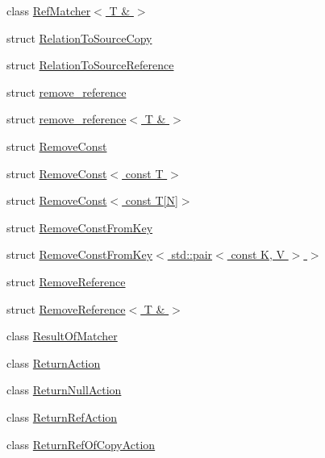 \begin{DoxyCompactItemize}
\item 
class \hyperlink{classtesting_1_1internal_1_1_ref_matcher_3_01_t_01_6_01_4}{Ref\+Matcher$<$ T \& $>$}
\item 
struct \hyperlink{structtesting_1_1internal_1_1_relation_to_source_copy}{Relation\+To\+Source\+Copy}
\item 
struct \hyperlink{structtesting_1_1internal_1_1_relation_to_source_reference}{Relation\+To\+Source\+Reference}
\item 
struct \hyperlink{structtesting_1_1internal_1_1remove__reference}{remove\+\_\+reference}
\item 
struct \hyperlink{structtesting_1_1internal_1_1remove__reference_3_01_t_01_6_01_4}{remove\+\_\+reference$<$ T \& $>$}
\item 
struct \hyperlink{structtesting_1_1internal_1_1_remove_const}{Remove\+Const}
\item 
struct \hyperlink{structtesting_1_1internal_1_1_remove_const_3_01const_01_t_01_4}{Remove\+Const$<$ const T $>$}
\item 
struct \hyperlink{structtesting_1_1internal_1_1_remove_const_3_01const_01_t[_n]_4}{Remove\+Const$<$ const T\mbox{[}\+N\mbox{]}$>$}
\item 
struct \hyperlink{structtesting_1_1internal_1_1_remove_const_from_key}{Remove\+Const\+From\+Key}
\item 
struct \hyperlink{structtesting_1_1internal_1_1_remove_const_from_key_3_01std_1_1pair_3_01const_01_k_00_01_v_01_4_01_4}{Remove\+Const\+From\+Key$<$ std\+::pair$<$ const K, V $>$ $>$}
\item 
struct \hyperlink{structtesting_1_1internal_1_1_remove_reference}{Remove\+Reference}
\item 
struct \hyperlink{structtesting_1_1internal_1_1_remove_reference_3_01_t_01_6_01_4}{Remove\+Reference$<$ T \& $>$}
\item 
class \hyperlink{classtesting_1_1internal_1_1_result_of_matcher}{Result\+Of\+Matcher}
\item 
class \hyperlink{classtesting_1_1internal_1_1_return_action}{Return\+Action}
\item 
class \hyperlink{classtesting_1_1internal_1_1_return_null_action}{Return\+Null\+Action}
\item 
class \hyperlink{classtesting_1_1internal_1_1_return_ref_action}{Return\+Ref\+Action}
\item 
class \hyperlink{classtesting_1_1internal_1_1_return_ref_of_copy_action}{Return\+Ref\+Of\+Copy\+Action}
\item 

\end{DoxyCompactItemize}
